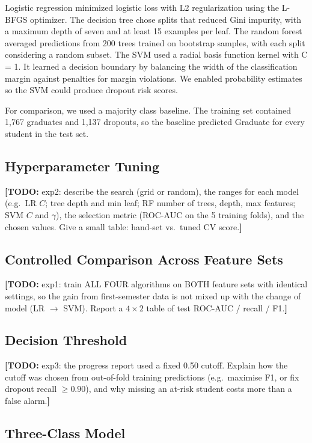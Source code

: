 \documentclass[11pt]{article}
\newcommand{\todo}[1]{{\color{red}\textbf{[TODO:} #1\textbf{]}}}
\newcommand{\todo}[1]{}
\begin{document}
Logistic regression minimized logistic loss with L2 regularization using the L-BFGS optimizer. The decision tree chose splits that reduced Gini impurity, with a maximum depth of seven and at least 15 examples per leaf. The random forest averaged predictions from 200 trees trained on bootstrap samples, with each split considering a random subset. The SVM used a radial basis function kernel with C = 1. It learned a decision boundary by balancing the width of the classification margin against penalties for margin violations. We enabled probability estimates so the SVM could produce dropout risk scores.

For comparison, we used a majority class baseline. The training set contained 1,767 graduates and 1,137 dropouts, so the baseline predicted Graduate for every student in the test set.

\subsection{Hyperparameter Tuning}

\todo{exp2: describe the search (grid or random), the ranges for each model (e.g.\ LR $C$; tree depth and min leaf; RF number of trees, depth, max features; SVM $C$ and $\gamma$), the selection metric (ROC-AUC on the 5 training folds), and the chosen values. Give a small table: hand-set vs.\ tuned CV score.}

\subsection{Controlled Comparison Across Feature Sets}

\todo{exp1: train ALL FOUR algorithms on BOTH feature sets with identical settings, so the gain from first-semester data is not mixed up with the change of model (LR $\rightarrow$ SVM). Report a $4 \times 2$ table of test ROC-AUC / recall / F1.}

\subsection{Decision Threshold}

\todo{exp3: the progress report used a fixed 0.50 cutoff. Explain how the cutoff was chosen from out-of-fold training predictions (e.g.\ maximise F1, or fix dropout recall $\geq 0.90$), and why missing an at-risk student costs more than a false alarm.}

\subsection{Three-Class Model}
\end{document}

